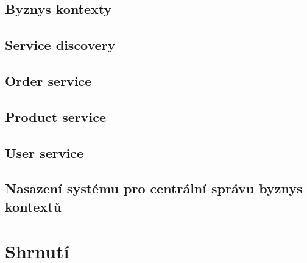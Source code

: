 \subsection{Byznys kontexty}

\subsection{Service discovery}

\subsection{Order service}

\subsection{Product service}

\subsection{User service}

\subsection{Nasazení systému pro centrální správu byznys kontextů}

\section{Shrnutí}
